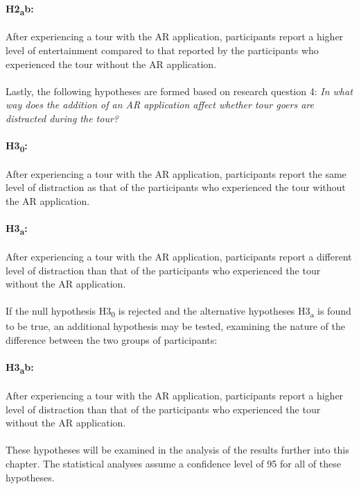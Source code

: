 \paragraph{H2\textsubscript{a}b:} After experiencing a tour with the AR application, participants report a higher level of entertainment compared to that reported by the participants who experienced the tour without the AR application.\\
\\
Lastly, the following hypotheses are formed based on research question 4: \textit{In what way does the addition of an AR application affect whether tour goers are distracted during the tour?}

\paragraph{H3\textsubscript{0}:} After experiencing a tour with the AR application, participants report the same level of distraction as that of the participants who experienced the tour without the AR application.

\paragraph{H3\textsubscript{a}:}After experiencing a tour with the AR application, participants report a different level of distraction than that of the participants who experienced the tour without the AR application.\\
\\
If the null hypothesis H3\textsubscript{0} is rejected and the alternative hypotheses H3\textsubscript{a} is found to be true, an additional hypothesis may be tested, examining the nature of the difference between the two groups of participants:

\paragraph{H3\textsubscript{a}b:} After experiencing a tour with the AR application, participants report a higher level of distraction than that of the participants who experienced the tour without the AR application.\\
\\
These hypotheses will be examined in the analysis of the results further into this chapter. The statistical analyses assume a confidence level of 95 for all of these hypotheses.

